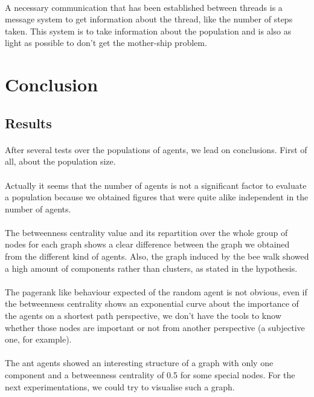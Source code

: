 \documentclass{article}
\begin{document}
		\paragraph{}
			A necessary communication that has been established between threads is a message system to get information about the thread,
			like the number of steps taken.
			This system is to take information about the population and is also as light as possible to don't get the mother-ship problem.

\newpage
\section{Conclusion}
	\subsection{Results}
		\paragraph{}
			After several tests over the populations of agents, we lead on conclusions.
			First of all, about the population size.
		\paragraph{}
			Actually it seems that the number of agents is not a significant factor to evaluate a population
			because we obtained figures that were quite alike independent in the number of agents.
		\paragraph{}
			The betweenness centrality value and its repartition over the whole group of nodes for each graph
			shows a clear difference between the graph we obtained from the different kind of agents.
			Also, the graph induced by the bee walk showed a high amount of components rather than clusters,
			as stated in the hypothesis.
		\paragraph{}
			The pagerank like behaviour expected of the random agent is not obvious,
			even if the betweenness centrality shows an exponential curve about the importance of the agents on a shortest path perspective,
			we don't have the tools to know whether those nodes are important or not from another perspective
			(a subjective one, for example).
		\paragraph{}
			The ant agents showed an interesting structure of a graph with only one component and a betweenness centrality of
			0.5 for some special nodes.
			For the next experimentations, we could try to visualise such a graph.
\end{document}
